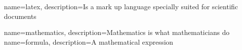 {
	name=latex,
	description={Is a mark up language specially suited 
		for scientific documents}
}

{
	name=mathematics,
	description={Mathematics is what mathematicians do}
}
{
	name=formula,
	description={A mathematical expression}
}
